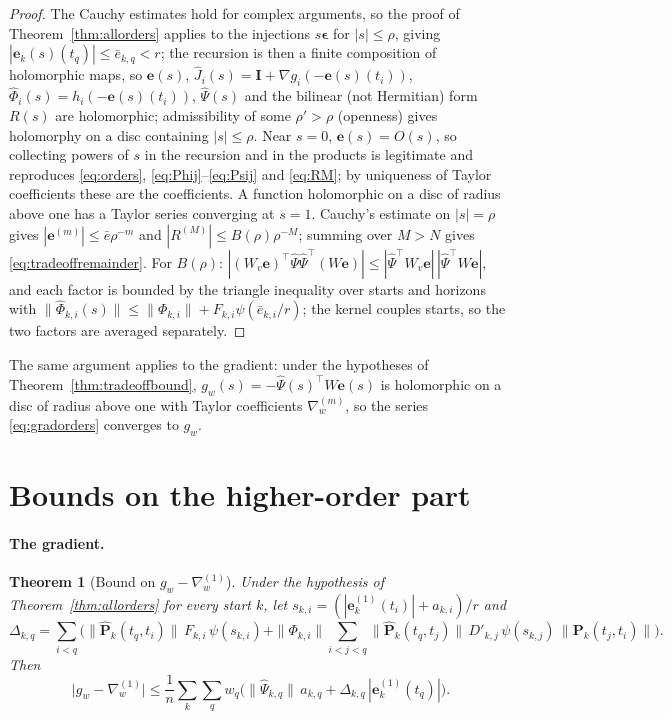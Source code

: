 \documentclass[11pt]{article}
\newtheorem{theorem}{Theorem}
\theoremstyle{definition}
\theoremstyle{remark}
\newcommand{\ee}{\mathbf{e}}
\newcommand{\I}{\mathbf{I}}
\newcommand{\eps}{\bm{\epsilon}}
\newcommand{\Pp}{\mathbf P}
\newcommand{\Ph}{\hat{\mathbf P}}
\newcommand{\Phih}{\hat\Phi}
\newcommand{\Psih}{\hat\Psi}
\begin{document}
\begin{proof}
The Cauchy estimates hold for complex arguments, so the proof of Theorem~\ref{thm:allorders} applies to the injections $s\eps$ for $|s|\le\rho$, giving $|\ee_k(s)(t_q)|\le\bar e_{k,q}<r$; the recursion is then a finite composition of holomorphic maps, so $\ee(s)$, $\hat J_i(s)=\I+\nabla g_i(-\ee(s)(t_i))$, $\Phih_i(s)=h_i(-\ee(s)(t_i))$, $\Psih(s)$ and the bilinear (not Hermitian) form $R(s)$ are holomorphic; admissibility of some $\rho'>\rho$ (openness) gives holomorphy on a disc containing $|s|\le\rho$.
Near $s=0$, $\ee(s)=O(s)$, so collecting powers of $s$ in the recursion and in the products is legitimate and reproduces \eqref{eq:orders}, \eqref{eq:Phij}--\eqref{eq:Psij} and \eqref{eq:RM}; by uniqueness of Taylor coefficients these are the coefficients.
A function holomorphic on a disc of radius above one has a Taylor series converging at $s=1$.
Cauchy's estimate on $|s|=\rho$ gives $|\ee^{(m)}|\le\bar e\rho^{-m}$ and $|R^{(M)}|\le B(\rho)\rho^{-M}$; summing over $M>N$ gives \eqref{eq:tradeoffremainder}.
For $B(\rho)$: $|(W_v\ee)^\top\Psih\Psih^\top(W\ee)|\le|\Psih^\top W_v\ee|\,|\Psih^\top W\ee|$, and each factor is bounded by the triangle inequality over starts and horizons with $\|\Phih_{k,i}(s)\|\le\|\Phi_{k,i}\|+F_{k,i}\psi(\bar e_{k,i}/r)$; the kernel couples starts, so the two factors are averaged separately.
\end{proof}

The same argument applies to the gradient: under the hypotheses of Theorem~\ref{thm:tradeoffbound}, $g_w(s)=-\Psih(s)^\top W\ee(s)$ is holomorphic on a disc of radius above one with Taylor coefficients $\nabla^{(m)}_w$, so the series \eqref{eq:gradorders} converges to $g_w$.

\section{Bounds on the higher-order part}\label{sec:bounds}

\paragraph{The gradient.}
\begin{theorem}[Bound on $g_w-\nabla^{(1)}_w$]\label{thm:gradbound}
Under the hypothesis of Theorem~\ref{thm:allorders} for every start $k$, let $s_{k,i}=(|\ee^{(1)}_k(t_i)|+a_{k,i})/r$ and
\[
\Delta_{k,q}=\sum_{i<q}\Big(\|\Ph_k(t_q,t_i)\|\,F_{k,i}\,\psi(s_{k,i})+\|\Phi_{k,i}\|\sum_{i<j<q}\|\Ph_k(t_q,t_j)\|\,D'_{k,j}\,\psi(s_{k,j})\,\|\Pp_k(t_j,t_i)\|\Big).
\]
Then
\begin{equation}\label{eq:gradbound}
\big|g_w-\nabla^{(1)}_w\big|\le\frac1n\sum_{k}\sum_{q}w_q\Big(\|\Psih_{k,q}\|\,a_{k,q}+\Delta_{k,q}\,|\ee^{(1)}_k(t_q)|\Big).
\end{equation}
\end{theorem}
\end{document}
